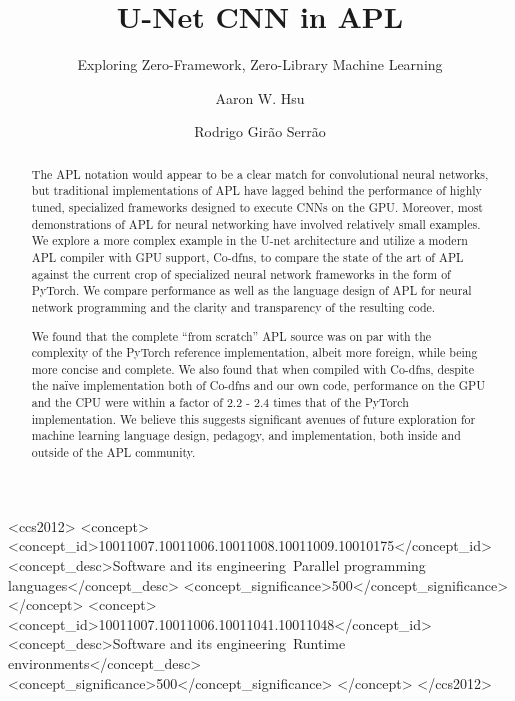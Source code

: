 \documentclass[10pt,twocolumn,english,format=sigplan,screen,balance]{acmart}
\begin{document}
\begin{CCSXML}
<ccs2012>
  <concept>
    <concept_id>10011007.10011006.10011008.10011009.10010175</concept_id>
    <concept_desc>Software and its engineering~Parallel programming languages</concept_desc> 
    <concept_significance>500</concept_significance>
  </concept>
  <concept>
    <concept_id>10011007.10011006.10011041.10011048</concept_id>
    <concept_desc>Software and its engineering~Runtime environments</concept_desc>
    <concept_significance>500</concept_significance>
  </concept>
</ccs2012>
\end{CCSXML}


\title{U-Net CNN in APL}
\subtitle{Exploring Zero-Framework, Zero-Library Machine Learning}
\author{Aaron W. Hsu}
\author{Rodrigo Girão Serrão}
\begin{abstract}
The APL notation would appear to be a clear match for convolutional
neural networks, but traditional implementations of APL have lagged
behind the performance of highly tuned, specialized frameworks designed
to execute CNNs on the GPU. Moreover, most demonstrations of APL for
neural networking have involved relatively small examples. We explore
a more complex example in the U-net architecture and utilize a modern
APL compiler with GPU support, Co-dfns, to compare the state of the
art of APL against the current crop of specialized neural network
frameworks in the form of PyTorch. We compare performance as well
as the language design of APL for neural network programming and the
clarity and transparency of the resulting code. 

We found that the complete “from scratch” APL source was on
par with the complexity of the PyTorch reference implementation, albeit
more foreign, while being more concise and complete. We also found
that when compiled with Co-dfns, despite the naïve implementation
both of Co-dfns and our own code, performance on the GPU and the CPU
were within a factor of 2.2 - 2.4 times that of the PyTorch implementation.
We believe this suggests significant avenues of future exploration
for machine learning language design, pedagogy, and implementation,
both inside and outside of the APL community. 
\end{abstract}
\maketitle
\end{document}
